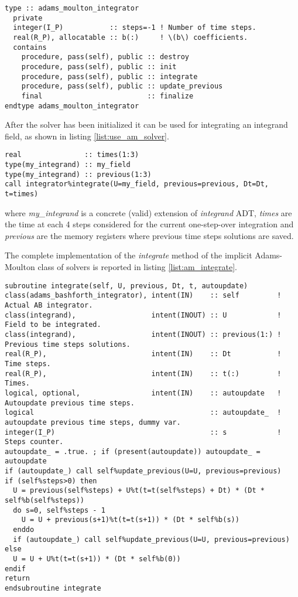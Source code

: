 \begin{lstlisting}[firstnumber=1,style=code,caption={definition of \emph{adams\_moulton\_integrator} type},label={list:am_solver}]
type :: adams_moulton_integrator
  private
  integer(I_P)           :: steps=-1 ! Number of time steps.
  real(R_P), allocatable :: b(:)     ! \(b\) coefficients.
  contains
    procedure, pass(self), public :: destroy
    procedure, pass(self), public :: init
    procedure, pass(self), public :: integrate
    procedure, pass(self), public :: update_previous
    final                         :: finalize
endtype adams_moulton_integrator
\end{lstlisting}

After the solver has been initialized it can be used for integrating an integrand field, as shown in listing \ref{list:use_am_solver}.

\begin{lstlisting}[firstnumber=1,style=code,caption={example of usage of an Adams-Moulton integrator},label={list:use_am_solver}]
real               :: times(1:3)
type(my_integrand) :: my_field
type(my_integrand) :: previous(1:3)
call integrator%integrate(U=my_field, previous=previous, Dt=Dt, t=times)
\end{lstlisting}
where \emph{my\_integrand} is a concrete (valid) extension of \emph{integrand} ADT, \emph{times} are the time at each 4 steps considered for the current one-step-over integration and \emph{previous} are the memory registers where previous time steps solutions are saved.

The complete implementation of the \emph{integrate} method of the implicit Adams-Moulton class of solvers is reported in listing \ref{list:am_integrate}.

\begin{lstlisting}[firstnumber=1,style=code,caption={implementation of the \emph{integrate} method of explicit Adams-Moulton class},label={list:am_integrate}]
subroutine integrate(self, U, previous, Dt, t, autoupdate)
class(adams_bashforth_integrator), intent(IN)    :: self         ! Actual AB integrator.
class(integrand),                  intent(INOUT) :: U            ! Field to be integrated.
class(integrand),                  intent(INOUT) :: previous(1:) ! Previous time steps solutions.
real(R_P),                         intent(IN)    :: Dt           ! Time steps.
real(R_P),                         intent(IN)    :: t(:)         ! Times.
logical, optional,                 intent(IN)    :: autoupdate   ! Autoupdate previous time steps.
logical                                          :: autoupdate_  ! autoupdate previous time steps, dummy var.
integer(I_P)                                     :: s            ! Steps counter.
autoupdate_ = .true. ; if (present(autoupdate)) autoupdate_ = autoupdate
if (autoupdate_) call self%update_previous(U=U, previous=previous)
if (self%steps>0) then
  U = previous(self%steps) + U%t(t=t(self%steps) + Dt) * (Dt * self%b(self%steps))
  do s=0, self%steps - 1
    U = U + previous(s+1)%t(t=t(s+1)) * (Dt * self%b(s))
  enddo
  if (autoupdate_) call self%update_previous(U=U, previous=previous)
else
  U = U + U%t(t=t(s+1)) * (Dt * self%b(0))
endif
return
endsubroutine integrate
\end{lstlisting}

